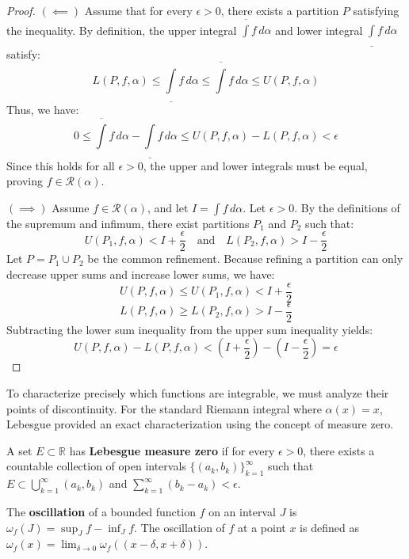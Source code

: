 \begin{proof}
$(\impliedby)$ Assume that for every $\epsilon > 0$, there exists a partition $P$ satisfying the inequality. By definition, the upper integral $\overline{\int} f \, d\alpha$ and lower integral $\underline{\int} f \, d\alpha$ satisfy:
\[
L(P, f, \alpha) \le \underline{\int} f \, d\alpha \le \overline{\int} f \, d\alpha \le U(P, f, \alpha)
\]
Thus, we have:
\[
0 \le \overline{\int} f \, d\alpha - \underline{\int} f \, d\alpha \le U(P, f, \alpha) - L(P, f, \alpha) < \epsilon
\]
Since this holds for all $\epsilon > 0$, the upper and lower integrals must be equal, proving $f \in \mathcal{R}(\alpha)$.

$(\implies)$ Assume $f \in \mathcal{R}(\alpha)$, and let $I = \int f \, d\alpha$. Let $\epsilon > 0$. By the definitions of the supremum and infimum, there exist partitions $P_1$ and $P_2$ such that:
\[
U(P_1, f, \alpha) < I + \frac{\epsilon}{2} \quad \text{and} \quad L(P_2, f, \alpha) > I - \frac{\epsilon}{2}
\]
Let $P = P_1 \cup P_2$ be the common refinement. Because refining a partition can only decrease upper sums and increase lower sums, we have:
\[
U(P, f, \alpha) \le U(P_1, f, \alpha) < I + \frac{\epsilon}{2}
\]
\[
L(P, f, \alpha) \ge L(P_2, f, \alpha) > I - \frac{\epsilon}{2}
\]
Subtracting the lower sum inequality from the upper sum inequality yields:
\[
U(P, f, \alpha) - L(P, f, \alpha) < \left(I + \frac{\epsilon}{2}\right) - \left(I - \frac{\epsilon}{2}\right) = \epsilon
\]
\end{proof}

To characterize precisely which functions are integrable, we must analyze their points of discontinuity. For the standard Riemann integral where $\alpha(x) = x$, Lebesgue provided an exact characterization using the concept of measure zero.

\begin{definition}
A set $E \subset \mathbb{R}$ has \textbf{Lebesgue measure zero} if for every $\epsilon > 0$, there exists a countable collection of open intervals $\{(a_k, b_k)\}_{k=1}^\infty$ such that $E \subset \bigcup_{k=1}^\infty (a_k, b_k)$ and $\sum_{k=1}^\infty (b_k - a_k) < \epsilon$.
\end{definition}

\begin{definition}
The \textbf{oscillation} of a bounded function $f$ on an interval $J$ is $\omega_f(J) = \sup_J f - \inf_J f$. The oscillation of $f$ at a point $x$ is defined as $\omega_f(x) = \lim_{\delta \to 0} \omega_f((x - \delta, x + \delta))$. 
\end{definition}

